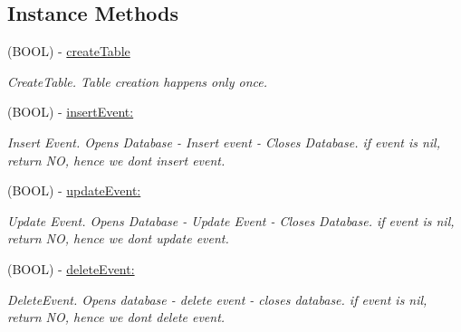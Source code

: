 \subsection*{Instance Methods}
\begin{DoxyCompactItemize}
\item 
\mbox{\label{interface_n_f_l_o_g_database_manager_a7e15bd9e71611889693d5d76564f5569}} 
(B\+O\+OL) -\/ \hyperlink{interface_n_f_l_o_g_database_manager_a7e15bd9e71611889693d5d76564f5569}{create\+Table}
\begin{DoxyCompactList}\small\item\em Create\+Table. Table creation happens only once. \end{DoxyCompactList}\item 
\mbox{\label{interface_n_f_l_o_g_database_manager_a1c26d05a773d01af4342cef1c5112f06}} 
(B\+O\+OL) -\/ \hyperlink{interface_n_f_l_o_g_database_manager_a1c26d05a773d01af4342cef1c5112f06}{insert\+Event\+:}
\begin{DoxyCompactList}\small\item\em Insert Event. Opens Database -\/ Insert event -\/ Closes Database. if event is nil, return NO, hence we dont insert event. \end{DoxyCompactList}\item 
\mbox{\label{interface_n_f_l_o_g_database_manager_a79ff4b36125958d5552b7ae780437557}} 
(B\+O\+OL) -\/ \hyperlink{interface_n_f_l_o_g_database_manager_a79ff4b36125958d5552b7ae780437557}{update\+Event\+:}
\begin{DoxyCompactList}\small\item\em Update Event. Opens Database -\/ Update Event -\/ Closes Database. if event is nil, return NO, hence we dont update event. \end{DoxyCompactList}\item 
\mbox{\label{interface_n_f_l_o_g_database_manager_a0e91938877e0300601a96bf34231eb2c}} 
(B\+O\+OL) -\/ \hyperlink{interface_n_f_l_o_g_database_manager_a0e91938877e0300601a96bf34231eb2c}{delete\+Event\+:}
\begin{DoxyCompactList}\small\item\em Delete\+Event. Opens database -\/ delete event -\/ closes database. if event is nil, return NO, hence we dont delete event. \end{DoxyCompactList}\item 

\end{DoxyCompactItemize}
